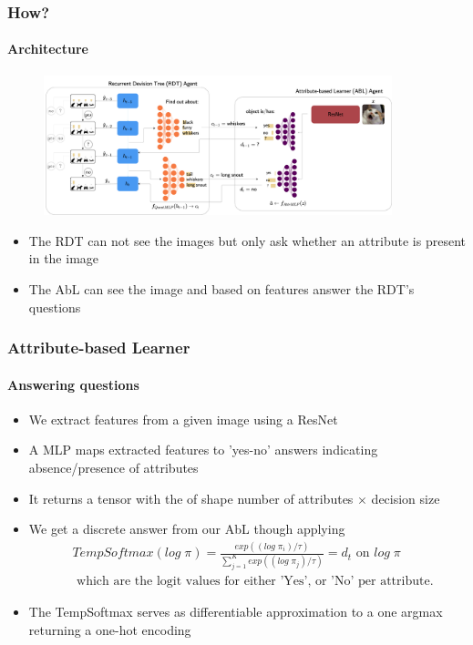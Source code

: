 \documentclass[9pt]{beamer}
\begin{document}
\begin{frame}
\frametitle{How?}
\framesubtitle{Architecture}
\begin{figure}
	\centering
	\includegraphics[width=0.9\textwidth]{images/uncertaintRDTC.pdf} 
	\label{fig:uncertainRDTC}
\end{figure}
\begin{itemize}
	\item The RDT can not see the images but only ask whether an attribute is present in the image
	\item The AbL can see the image and based on features answer the RDT's questions
\end{itemize}
\end{frame} 





\begin{frame}
\frametitle{Attribute-based Learner}
\framesubtitle{Answering questions}
\begin{itemize}
	\item We extract features from a given image using a ResNet
	\item A MLP maps extracted features to 'yes-no' answers indicating absence/presence of attributes
	\item It returns a tensor with the of shape number of attributes $\times$ decision size
	\item We get a discrete answer from our AbL though applying \begin{align*}
	&TempSoftmax(log\;\pi) = \frac{exp((log\;\pi_i)/\tau)}{\sum_{j=1}^{K}exp((log\;\pi_j)/\tau)} = d_t
	\text{ on }
	log\;\pi \\
	&\text{ which are the logit values for either 'Yes', or 'No' per attribute.}
\end{align*}
\item The TempSoftmax serves as differentiable approximation to a one argmax returning a one-hot encoding
\end{itemize}
\end{frame}
\end{document}
